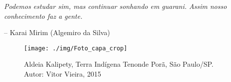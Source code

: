
\vspace*{\fill}

\epigraph{\emph{Podemos estudar sim, mas continuar sonhando em guarani. Assim nosso conhecimento faz a gente.}}{-- Karai Mirim (Algemiro da Silva)}

\thispagestyle{empty}

\pagebreak

\vspace*{\fill}

\begin{figure}[H]
\begin{adjustwidth}{-2.7cm}{}
  \texttt{[image: ./img/Foto\_capa\_crop]}
\end{adjustwidth}
\caption{Aldeia Kalipety, Terra Indígena Tenonde Porã, São Paulo/SP. Autor: Vitor Vieira, 2015}
\end{figure}

\vspace*{\fill}

\thispagestyle{empty}